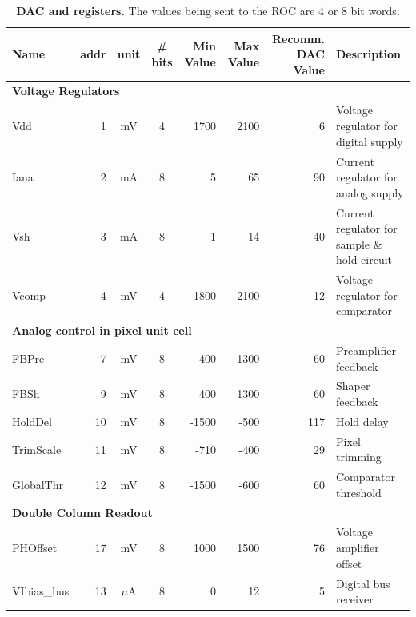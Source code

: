 \begin{table}[h]
    \begin{center}
	\caption{\textbf{DAC and registers.} The values being sent to the ROC are 4 or 8 bit words.}
	\label{tab:DecBinHex}

	\bigskip

	{\scriptsize
	\begin{tabular}{lrccrrrl}
	\toprule
	Name & addr & unit & \# bits & \multicolumn{1}{p{0.8cm}}{Min Value} & \multicolumn{1}{p{0.8cm}}{Max Value} & \multicolumn{1}{p{1.2cm}}{Recomm. DAC Value} & Description \\ 
	\midrule
	\multicolumn{ 8}{l}{\textbf{Voltage Regulators}} \\ 
	Vdd         &  1 &   mV    & 4 & 1700 & 2100 & 6 & Voltage regulator for digital supply \\ 
	Iana        &  2 &   mA    & 8 & 5 & 65 & 90 & Current regulator for analog supply \\ 
	Vsh         &  3 &   mA    & 8 & 1 & 14 & 40 & Current regulator for sample \& hold circuit \\ 
	Vcomp       &  4 &   mV    & 4 & 1800 & 2100 & 12 & Voltage regulator for comparator \\ 
	\midrule
	\multicolumn{ 8}{l}{\textbf{Analog control in pixel unit cell}} \\ 
	FBPre       &  7 &   mV    & 8 & 400 & 1300 & 60 & Preamplifier feedback  \\ 
	FBSh        &  9 &   mV    & 8 & 400 & 1300 & 60 & Shaper feedback \\ 
	HoldDel     & 10 &   mV    & 8 & -1500 & -500 & 117 & Hold delay \\ 
	TrimScale   & 11 &   mV    & 8 & -710 & -400 & 29 & Pixel trimming \\ 
	GlobalThr   & 12 &   mV    & 8 & -1500 & -600 & 60 & Comparator threshold \\ 
	\midrule
	\multicolumn{ 8}{l}{\textbf{Double Column Readout}} \\ 
	PHOffset    & 17 &   mV    & 8 & 1000 & 1500 & 76 & Voltage amplifier offset \\ 
	VIbias\_bus & 13 & $\mu$A  & 8 & 0 & 12 & 5 & Digital bus receiver \\ 

\end{tabular}}
\end{center}
\end{table}
